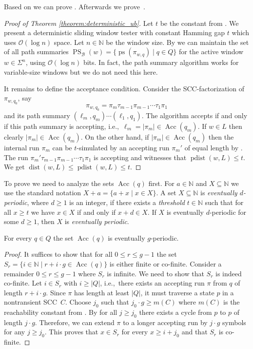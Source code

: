 \documentclass{article}\usepackage[a4paper,margin=20mm]{geometry}
\newcommand{\N}{\mathbb{N}}
\newcommand{\B}{\mathcal{B}}
\renewcommand{\O}{\mathcal{O}}
\DeclareMathOperator{\ps}{ps}
\DeclareMathOperator{\PS}{PS}
\DeclareMathOperator{\dist}{dist}
\DeclareMathOperator{\pdist}{pdist}
\DeclareMathOperator{\Acc}{Acc}
\renewcommand{\geq}{\geqslant}
\renewcommand{\leq}{\leqslant}
\renewcommand{\ge}{\geq}
\renewcommand{\le}{\leq}
\begin{document}
Based on  we can prove . Afterwards we prove~.

\begin{proof}[Proof of Theorem  \ref{theorem:deterministic_ub}]
Let $t$ be the constant from .
We present a deterministic sliding window tester with constant Hamming gap $t$ which uses $\O(\log n)$ space.
Let $n \in \N$ be the window size.
By  we can maintain the set of all path summaries
$\PS_\B(w) = \{ \ps(\pi_{w,q}) \mid q \in Q \}$ for the active window $w \in \Sigma^n$,
using $\O(\log n)$ bits.
In fact, the path summary algorithm works for variable-size windows but we do not need this here.

It remains to define the acceptance condition.
Consider the SCC-factoriza\-tion of $\pi_{w,q_0}$,
say 
\[  \pi_{w,q_0} = \pi_m \tau_{m-1} \pi_{m-1} \cdots \tau_1 \pi_1 \]
and its path summary $(\ell_m,q_m) \cdots (\ell_1,q_1)$.
The algorithm accepts if and only if this path summary is accepting, i.e.,~$\ell_m = |\pi_m| \in \Acc(q_m)$.
If $w \in L$ then clearly $|\pi_m| \in \Acc(q_m)$.
On the other hand, if $|\pi_m| \in \Acc(q_m)$
then the internal run $\pi_m$ can be $t$-simulated by an accepting run $\pi_m'$ of equal length by .
The run $\pi_m' \tau_{m-1} \pi_{m-1} \cdots \tau_1 \pi_1$ is accepting
and witnesses that $\pdist(w,L) \le t$. We get $\dist(w, L) \leq \pdist(w,L) \leq t$.
\end{proof}

To prove  we need to analyze the sets $\Acc(q)$ first.
For $a \in \N$ and $X \subseteq \N$ we use the standard notation
$X + a = \{a+x \mid x \in X\}$.
A set $X \subseteq \N$ is {\em eventually $d$-periodic},
where $d \ge 1$ is an integer,
if there exists a {\em threshold} $t \in \N$ such that for all $x \ge t$
we have $x \in X$ if and only if $x + d \in X$.
If $X$ is eventually $d$-periodic for some $d \ge 1$, then $X$ is {\em eventually periodic}.

\begin{lemma}
\label{lem:acc-per}
For every $q \in Q$ the set $\Acc(q)$ is eventually $g$-periodic.
\end{lemma}

\begin{proof}
	It suffices to show that for all $0 \le r \le g-1$
	the set $S_r = \{ i \in \N \mid r + i \cdot g \in \Acc(q) \}$
	is either finite or co-finite.
	Consider a remainder $0 \le r \le g-1$ where $S_r$ is infinite.
	We need to show that $S_r$ is indeed co-finite.
	Let $i \in S_r$ with $i \ge |Q|$,
	i.e.,~there exists an accepting run $\pi$ from $q$ of length $r + i \cdot g$.
	Since $\pi$ has length at least $|Q|$, it must traverse a state $p$ in a nontransient SCC~$C$.
	Choose $j_0$ such that $j_0 \cdot g \ge m(C)$
	where $m(C)$ is the reachability constant from .
	By  for all $j \ge j_0$
	there exists a cycle from $p$ to $p$ of length $j \cdot g$.
	Therefore, we can extend $\pi$ to a longer accepting run by $j \cdot g$ symbols
	for any $j \ge j_0$.
	This proves that $x \in S_r$ for every $x \geq i + j_0$
	and that $S_r$ is co-finite.
\end{proof}
\end{document}
